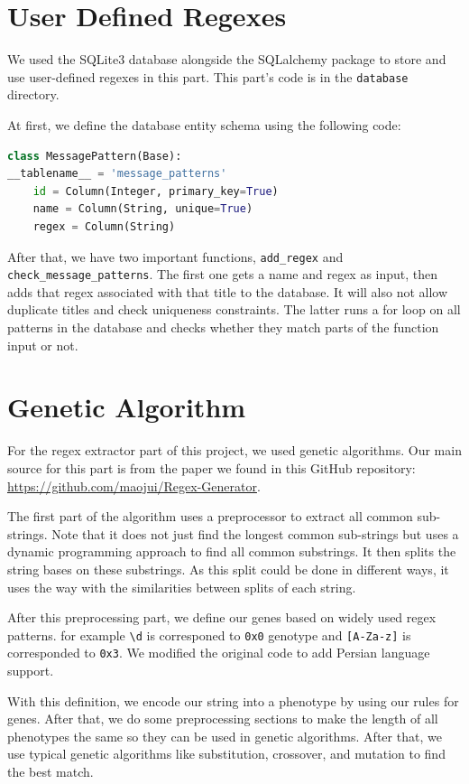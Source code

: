\documentclass[12pt]{article}
\begin{document}
\section{User Defined Regexes}

We used the SQLite3 database alongside the SQLalchemy package to store and use user-defined regexes in this part. This part's code is in the \verb*|database| directory. 

At first, we define the database entity schema using the following code:

\begin{lstlisting}[language=python]
class MessagePattern(Base):
__tablename__ = 'message_patterns'
	id = Column(Integer, primary_key=True)
	name = Column(String, unique=True)
	regex = Column(String)
\end{lstlisting}


After that, we have two important functions, \verb*|add_regex| and \verb*|check_message_patterns|. The first one gets a name and regex as input, then adds that regex associated with that title to the database. It will also not allow duplicate titles and check uniqueness constraints. The latter runs a for loop on all patterns in the database and checks whether they match parts of the function input or not.

\section{Genetic Algorithm}

For the regex extractor part of this project, we used genetic algorithms. Our main source for this part is from the paper we found in this GitHub repository: \url{https://github.com/maojui/Regex-Generator}.

The first part of the algorithm uses a preprocessor to extract all common sub-strings. Note that it does not just find the longest common sub-strings but uses a dynamic programming approach to find all common substrings. It then splits the string bases on these substrings. As this split could be done in different ways, it uses the way with the similarities between splits of each string.

After this preprocessing part, we define our genes based on widely used regex patterns. for example \verb*|\d| is corresponed to \verb*|0x0| genotype and \verb*|[A-Za-z]| is corresponded to \verb*|0x3|.  We modified the original code to add Persian language support.

With this definition, we encode our string into a phenotype by using our rules for genes. After that, we do some preprocessing sections to make the length of all phenotypes the same so they can be used in genetic algorithms. After that, we use typical genetic algorithms like substitution, crossover, and mutation to find the best match.
\end{document}
